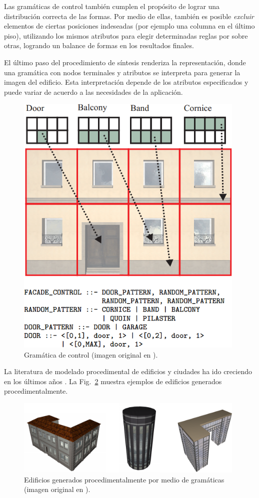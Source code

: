 Las gramáticas de control también cumplen el propósito de lograr una distribución correcta de las formas.
Por medio de ellas, también es posible {\em excluir} elementos de ciertas posiciones indeseadas (por ejemplo una columna en el último piso), utilizando los mismos atributos para elegir determinadas reglas por sobre otras, logrando un balance de formas en los resultados finales.

El último paso del procedimiento de síntesis renderiza la representación, donde una gramática con nodos terminales y atributos se interpreta para generar la imagen del edificio.
Esta interpretación depende de los atributos especificados y puede variar de acuerdo a las necesidades de la aplicación.

\begin{figure}
\center
\includegraphics[width=11cm]{figures/controlgrammar}
\caption[Gramática de control.]{Gramática de control (imagen original en \cite{Wonka2003}).}
\label{fg:controlgrammar}
\end{figure}

La literatura de modelado procedimental de edificios y ciudades ha ido creciendo en los últimos años \cite{Parish2001,Muller2006}.
La Fig.~\ref{fg:edificios} muestra ejemplos de edificios generados procedimentalmente.


\begin{figure}
\center
\includegraphics[width=11cm]{figures/edificios}
\caption[Edificios generados procedimentalmente por medio de gramáticas.]{Edificios generados procedimentalmente por medio de gramáticas (imagen original en \cite{Wonka2003}).}
\label{fg:edificios}
\end{figure}

